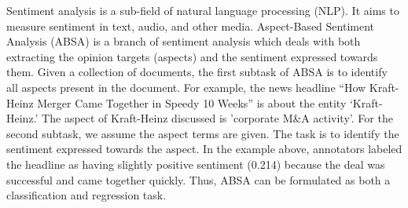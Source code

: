 






Sentiment analysis is a sub-field of natural language processing (NLP).
It aims to measure sentiment in text, audio, and other media. Aspect-Based Sentiment Analysis (ABSA) is a branch of sentiment analysis which deals with both extracting the opinion targets (aspects) and the sentiment expressed towards them.
Given a collection of documents, the first subtask of ABSA is to identify all aspects present in the document.
For example, the news headline “How Kraft-Heinz Merger Came Together in Speedy 10 Weeks” is about the entity ‘Kraft-Heinz.’ The aspect of Kraft-Heinz discussed is 'corporate M\&A activity'.
For the second subtask, we assume the aspect terms are given.
The task is to identify the sentiment expressed towards the aspect.
In the example above, annotators labeled the headline as having slightly positive sentiment (0.214) because the deal was successful and came together quickly.
Thus, ABSA can be formulated as both a classification and regression task.



